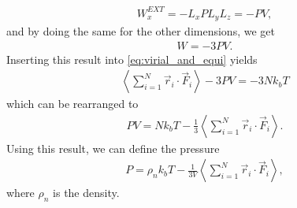 \begin{align}
    W^{EXT}_x = -L_xPL_yL_z = -PV,
\end{align}
and by doing the same for the other dimensions, we get
\begin{align}
    W = -3PV.
\end{align}
Inserting this result into \eqref{eq:virial_and_equi} yields
\begin{align}
    \left\langle \sum_{i=1}^N \vec r_i \cdot \vec F_i\right\rangle - 3PV = -3Nk_bT
\end{align}
which can be rearranged to
\begin{align}
    PV = Nk_bT - \frac{1}{3}\left\langle \sum_{i=1}^N \vec r_i \cdot \vec F_i\right\rangle.
\end{align}
Using this result, we can define the pressure
\begin{align}
    \label{eq:pressure_in_md}
	P = \rho_n k_bT - \frac{1}{3V}\left\langle \sum_{i=1}^N \vec r_i \cdot \vec F_i\right\rangle,
\end{align}
where $\rho_n$ is the density.